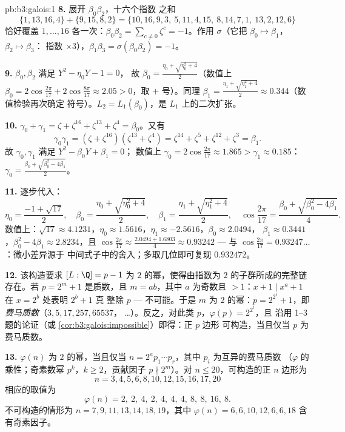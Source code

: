 \begin{solution}{pb:b3:galois:1}
\textbf{8.} 展开 $\beta_0\beta_2$，十六个指数
之和
\[
\{1,13,16,4\} + \{9,15,8,2\} =
\{10,16,9,3,\ 5,11,4,15,\ 8,14,7,1,\ 13,2,12,6\}
\]
恰好覆盖 $1, \dots, 16$ 各一次：$\beta_0\beta_2 =
\sum_{c\ne0}\zeta^c = -1$。作用 $\sigma$（它把
$\beta_0 \mapsto \beta_1$，$\beta_2 \mapsto \beta_3$：
指数 $\times 3$），$\beta_1\beta_3 = \sigma(\beta_0\beta_2)
= -1$。

\textbf{9.} $\beta_0, \beta_2$ 满足 $Y^2 - \eta_0 Y - 1 = 0$，
故 $\beta_0 = \frac{\eta_0 + \sqrt{\eta_0^2 + 4}}2$（数值上
$\beta_0 = 2\cos\frac{2\pi}{17} + 2\cos\frac{8\pi}{17} \approx
2.05 > 0$，取 $+$ 号）。同理 $\beta_1 = \frac{\eta_1 +
\sqrt{\eta_1^2 + 4}}2 \approx 0.344$（数值检验再次确定
符号）。$L_2 = L_1(\beta_0)$，是 $L_1$ 上的二次扩张。

\textbf{10.} $\gamma_0 + \gamma_1 = \zeta + \zeta^{16} +
\zeta^{13} + \zeta^4 = \beta_0$。又有
\[
\gamma_0\gamma_1 = (\zeta + \zeta^{16})(\zeta^{13} + \zeta^4)
= \zeta^{14} + \zeta^{5} + \zeta^{12} + \zeta^{3} = \beta_1 .
\]
故 $\gamma_0, \gamma_1$ 满足 $Y^2 - \beta_0Y + \beta_1 = 0$；
数值上 $\gamma_0 = 2\cos\frac{2\pi}{17} \approx 1.865 >
\gamma_1 \approx 0.185$：$\gamma_0 = \frac{\beta_0 +
\sqrt{\beta_0^2 - 4\beta_1}}2$。

\textbf{11.} 逐步代入：
\[
\eta_0 = \frac{-1 + \sqrt{17}}2,
\quad
\beta_0 = \frac{\eta_0 + \sqrt{\eta_0^2 + 4}}2,
\quad
\beta_1 = \frac{\eta_1 + \sqrt{\eta_1^2 + 4}}2,
\quad
\cos\frac{2\pi}{17} = \frac{\beta_0 + \sqrt{\beta_0^2 -
4\beta_1}}4 .
\]
数值上：$\sqrt{17} \approx 4.1231$，$\eta_0 \approx
1.5616$，$\eta_1 \approx -2.5616$，$\beta_0 \approx 2.0494$，
$\beta_1 \approx 0.3441$，$\beta_0^2 - 4\beta_1 \approx
2.8234$，且 $\cos\frac{2\pi}{17} \approx \frac{2.0494 +
1.6803}4 \approx 0.93242$ --- 与 $\cos\frac{2\pi}{17} =
0.93247\dots$：微小差异源于
中间式子中的舍入；多取几位即可复现
$0.932472$。

\textbf{12.} 该构造要求 $[L:\Q] = p - 1$ 为
$2$ 的幂，使得由指数为 $2$ 的子群所成的完整链
存在。若 $p = 2^m + 1$ 是质数，且 $m = ab$，其中 $a$ 为奇数且 $>
1$：$x + 1 \mid x^a + 1$ 在 $x = 2^b$ 处表明 $2^b + 1$ 真
整除 $p$ --- 不可能。于是 $m$ 为 $2$ 的幂：$p =
2^{2^t} + 1$，即\emph{费马质数}（$3, 5, 17, 257, 65537$，
\dots）。反之，对此类 $p$，$\varphi(p) = 2^{2^t}$，且
沿用 1--3 题的论证（或
\cref{cor:b3:galois:impossible}）即得：正 $p$ 边形
可构造，当且仅当 $p$ 为费马质数。

\textbf{13.} $\varphi(n)$ 为 $2$ 的幂，当且仅当 $n =
2^a p_1\cdots p_r$，其中 $p_i$ 为互异的费马质数
（$\varphi$ 的乘性；奇素数幂 $p^k$，$k
\geq 2$，贡献因子 $p \nmid 2^m$）。对 $n \leq
20$，可构造的正 $n$ 边形为
\[
n = 3, 4, 5, 6, 8, 10, 12, 15, 16, 17, 20
\]
相应的取值为
\[
\varphi(n) = 2,\ 2,\ 4,\ 2,\ 4,\ 4,\ 4,\ 8,\ 8,\ 16,\ 8 .
\]
不可构造的情形为 $n = 7, 9, 11, 13, 14, 18, 19$，其中
$\varphi(n) = 6, 6, 10, 12, 6, 6, 18$ 含有奇素因子。


\end{solution}
